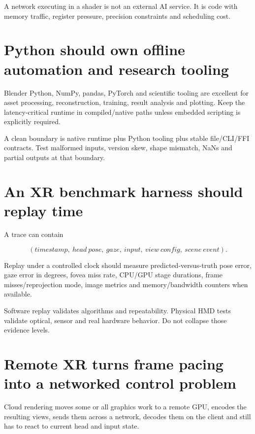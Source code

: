 A network executing in a shader is not an external AI service. It is code with memory traffic, register pressure, precision constraints and scheduling cost.

\section{Python should own offline automation and research tooling}\label{06-engine-ii-ch042-python-should-own-offline-automation-and-research-tooling}

Blender Python, NumPy, pandas, PyTorch and scientific tooling are excellent for asset processing, reconstruction, training, result analysis and plotting. Keep the latency-critical runtime in compiled/native paths unless embedded scripting is explicitly required.

A clean boundary is native runtime plus Python tooling plus stable file/CLI/FFI contracts. Test malformed inputs, version skew, shape mismatch, NaNs and partial outputs at that boundary.

\section{An XR benchmark harness should replay time}\label{06-engine-ii-ch042-an-xr-benchmark-harness-should-replay-time}

A trace can contain

\[
(timestamp,\ head\ pose,\ gaze,\ input,\ view\ config,\ scene\ event).
\]

Replay under a controlled clock should measure predicted-versus-truth pose error, gaze error in degrees, fovea miss rate, CPU/GPU stage durations, frame misses/reprojection mode, image metrics and memory/bandwidth counters when available.

Software replay validates algorithms and repeatability. Physical HMD tests validate optical, sensor and real hardware behavior. Do not collapse those evidence levels.

\section{Remote XR turns frame pacing into a networked control problem}\label{06-engine-ii-ch042-remote-xr-turns-frame-pacing-into-a-networked-control-problem}

Cloud rendering moves some or all graphics work to a remote GPU, encodes the resulting views, sends them across a network, decodes them on the client and still has to react to current head and input state.

